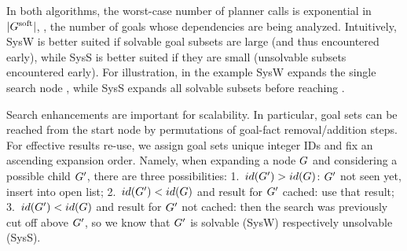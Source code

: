 In both algorithms, the worst-case number of planner calls is
exponential in $|G^{\text{\textup{soft}}}|$, \ie, the number of goals whose
dependencies are being analyzed. Intuitively, SysW is better suited if
solvable goal subsets are large (and thus encountered early), while
SysS is better suited if they are small (unsolvable subsets
encountered early). For illustration, in the example SysW expands the
single search node \goalsoft, while SysS expands all solvable subsets
before reaching \goalsoft.

%
%
%
%
%
%
%


Search enhancements are important for scalability. In particular, goal
sets can be reached from the start node by permutations of goal-fact
removal/addition steps. For effective results re-use, we assign goal
sets unique integer IDs and fix an ascending expansion order. Namely,
when expanding a node $G$ and considering a possible child
$G'$, there are three possibilities: 1.\ $id(G') > id(G)$:
$G'$ not seen yet, insert into open list; 2.\ $id(G') <
id(G)$ and result for $G'$ cached: use that result;
3.\ $id(G') < id(G)$ and result for $G'$ not cached: then
the search was previously cut off above $G'$, so we know that
$G'$ is solvable (SysW) respectively unsolvable (SysS).


